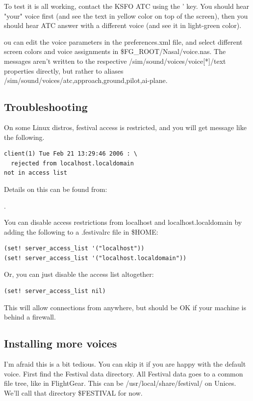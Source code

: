 To test it is all working, contact the KSFO ATC using the ' key. You should hear "your" 
voice first (and see the text in yellow color on top of the screen), then you should hear 
ATC answer with a different voice (and see it in light-green color).

ou can edit the voice parameters in the preferences.xml file, and select different screen colors 
and voice assignments in \$FG\_ROOT/Nasal/voice.nas. The messages aren't written to the 
respective /sim/sound/voices/voice[*]/text properties directly, but rather to aliases 
/sim/sound/voices/{atc,approach,ground,pilot,ai-plane}.

\subsection{Troubleshooting}

On some Linux distros, festival access is restricted, and you will get message like the following. 

\begin{verbatim}
client(1) Tue Feb 21 13:29:46 2006 : \
  rejected from localhost.localdomain 
not in access list
\end{verbatim}

Details on this can be found from:

.

You can disable access restrictions from localhost and localhost.localdomain by adding
the following to a .festivalrc file in \$HOME:
\begin{verbatim}
(set! server_access_list '("localhost"))
(set! server_access_list '("localhost.localdomain"))
\end{verbatim}

Or, you can just disable the access list altogether:

\begin{verbatim}
(set! server_access_list nil)
\end{verbatim}

This will allow connections from anywhere, but should be OK if your machine is behind a
firewall.

\subsection{Installing more voices}

I'm afraid this is a bit tedious. You can skip it if you are happy with the default voice. 
First find the Festival data directory. All Festival data goes to a common file tree, 
like in FlightGear. This can be /usr/local/share/festival/ on Unices. We'll call that 
directory \$FESTIVAL for now.

